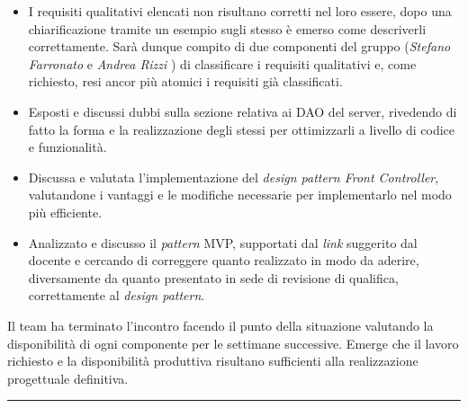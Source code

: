 \documentclass[a4paper,10pt,openright]{article}
\begin{document}
\begin{itemize}
\item I requisiti qualitativi elencati non risultano corretti nel loro essere, dopo una chiarificazione tramite un esempio sugli stesso è emerso come descriverli correttamente.
Sarà dunque compito di due componenti del gruppo (\textit{Stefano Farronato} e \textit{Andrea Rizzi} ) di classificare i requisiti qualitativi e, come richiesto, resi ancor più atomici i requisiti già classificati.

\item Esposti e discussi dubbi sulla sezione relativa ai DAO del server, rivedendo di fatto la forma e la realizzazione degli stessi per ottimizzarli a livello di codice e funzionalità. 

\item Discussa e valutata l'implementazione del \textit{design pattern Front Controller}, valutandone i vantaggi e le modifiche necessarie per implementarlo nel modo più efficiente.

\item Analizzato e discusso il \textit{pattern} MVP, supportati dal \textit{link} suggerito dal docente e cercando di correggere quanto realizzato in modo da aderire, diversamente da quanto presentato in sede di revisione di qualifica, correttamente al \textit{design pattern}.

\end{itemize}


Il team ha terminato l'incontro facendo il punto della situazione valutando la disponibilità di ogni componente per le settimane successive. Emerge che il lavoro richiesto e la disponibilità produttiva risultano sufficienti alla realizzazione progettuale definitiva.\\
\noindent\rule{\textwidth}{0.4pt}
\end{document}
